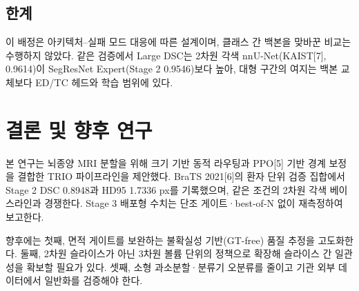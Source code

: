 \documentclass[11pt,a4paper]{article}
\begin{document}
\subsection{한계}
이 배정은 아키텍처--실패 모드 대응에 따른 설계이며, 클래스 간 백본을 맞바꾼 비교는 수행하지 않았다. 같은 검증에서 Large DSC는 2차원 각색 nnU-Net(KAIST[7], 0.9614)이 SegResNet Expert(Stage 2 0.9546)보다 높아, 대형 구간의 여지는 백본 교체보다 ED/TC 헤드와 학습 범위에 있다.

\section{결론 및 향후 연구}
본 연구는 뇌종양 MRI 분할을 위해 크기 기반 동적 라우팅과 PPO[5] 기반 경계 보정을 결합한 TRIO 파이프라인을 제안했다. BraTS 2021[6]의 환자 단위 검증 집합에서 Stage 2 DSC 0.8948과 HD95 1.7336 px를 기록했으며, 같은 조건의 2차원 각색 베이스라인과 경쟁한다. Stage 3 배포형 수치는 단조 게이트·best-of-N 없이 재측정하여 보고한다.

향후에는 첫째, 면적 게이트를 보완하는 불확실성 기반(GT-free) 품질 추정을 고도화한다. 둘째, 2차원 슬라이스가 아닌 3차원 볼륨 단위의 정책으로 확장해 슬라이스 간 일관성을 확보할 필요가 있다. 셋째, 소형 과소분할·분류기 오분류를 줄이고 기관 외부 데이터에서 일반화를 검증해야 한다.
\end{document}

